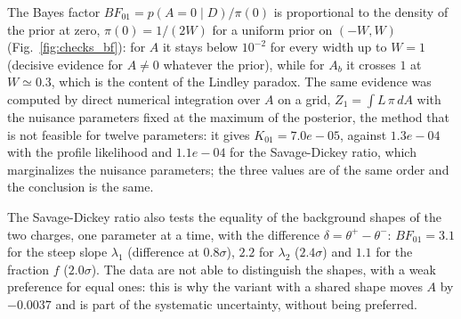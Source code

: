 \begin{table}[h]
\centering
{}
\caption{Posterior of $A$ under alternative priors, by importance reweighting of the chain; ESS: effective sample size of the $20{,}000$ thinned samples.}
\label{tab:checks_prior}
\end{table}

The Bayes factor $BF_{01}=p(A=0\mid D)/\pi(0)$ is proportional to the density of the prior at zero, $\pi(0)=1/(2W)$ for a uniform prior on $(-W,W)$ (Fig.~\ref{fig:checks_bf}): for $A$ it stays below $10^{-2}$ for every width up to $W=1$ (decisive evidence for $A\neq0$ whatever the prior), while for $A_b$ it crosses $1$ at $W\simeq0.3$, which is the content of the Lindley paradox. The same evidence was computed by direct numerical integration over $A$ on a grid, $Z_1=\int L\,\pi\,dA$ with the nuisance parameters fixed at the maximum of the posterior, the method that is not feasible for twelve parameters: it gives $K_{01}=7.0e-05$, against $1.3e-04$ with the profile likelihood and $1.1e-04$ for the Savage-Dickey ratio, which marginalizes the nuisance parameters; the three values are of the same order and the conclusion is the same.


The Savage-Dickey ratio also tests the equality of the background shapes of the two charges, one parameter at a time, with the difference $\delta=\theta^+-\theta^-$: $BF_{01}=3.1$ for the steep slope $\lambda_1$ (difference at $0.8\sigma$), $2.2$ for $\lambda_2$ ($2.4\sigma$) and $1.1$ for the fraction $f$ ($2.0\sigma$). The data are not able to distinguish the shapes, with a weak preference for equal ones: this is why the variant with a shared shape moves $A$ by $-0.0037$ and is part of the systematic uncertainty, without being preferred.

